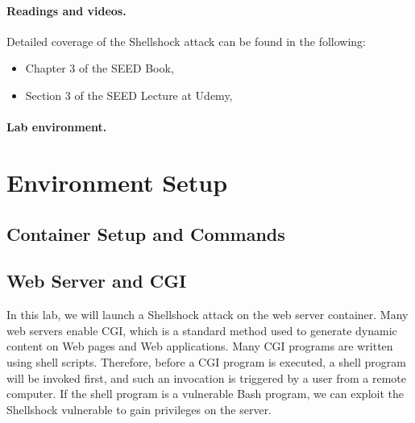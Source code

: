 \paragraph{Readings and videos.}
Detailed coverage of the Shellshock attack can be found in the following:

\begin{itemize}
\item Chapter 3 of the SEED Book, \seedbook
\item Section 3 of the SEED Lecture at Udemy, \seedcsvideo
\end{itemize}


\paragraph{Lab environment.} \seedenvironmentB \nodependency



\section{Environment Setup} 

\subsection{Container Setup and Commands}




\subsection{Web Server and CGI}

In this lab, we will launch a Shellshock attack on the web server container. 
Many web servers enable CGI, which is a standard method used to generate
dynamic content on Web pages and Web applications. Many CGI programs are
written using shell scripts. Therefore, before a CGI program is executed,
a shell program will be invoked first, and such an invocation is
triggered by a user from a remote computer. If the shell program is
a vulnerable Bash program, we can exploit the Shellshock vulnerable to
gain privileges on the server.


